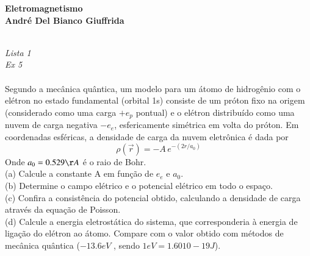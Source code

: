 \documentclass[a4paper,11pt]{exam}
\begin{document}
\begingroup 
	  \bf \Large Eletromagnetismo\\
	  \indent \normalsize André Del Bianco Giuffrida
	\endgroup
	\\ \quad
	\\
	\large{
	\emph{Lista 1 \\ Ex 5}
	\\
	\\
	Segundo a mecânica quântica, um modelo para um átomo de hidrogênio com o elétron no estado fundamental (orbital 1s) consiste de um próton fixo na origem (considerado como uma carga $+e_p$ pontual) e o elétron distribuído como uma nuvem de carga negativa $-e_e$, esfericamente simétrica em volta do próton. Em coordenadas esféricas, a densidade de carga da nuvem eletrônica é dada por 
	\[\rho(\vec{r}) = -A \, e^{-(2r/a_{0})}\]
	Onde $a_0 = 0.529 \AA $ é o raio de Bohr.\\
	(a) Calcule a constante A em função de $e_e$ e $a_0$. \\
	(b) Determine o campo elétrico e o potencial elétrico em todo o espaço.\\
	(c) Confira a consistência do potencial obtido, calculando a densidade de carga através da equação de Poisson.\\
	(d) Calcule a energia eletrostática do sistema, que corresponderia à energia de ligação do elétron ao átomo. Compare com o valor obtido com métodos de mecânica quântica ($-13.6eV$ , sendo $1eV = 1.60 10-19J$).

	
	\begin{figure}[htbp]
		\hfill
	\end{figure}
	
}
\end{document}
